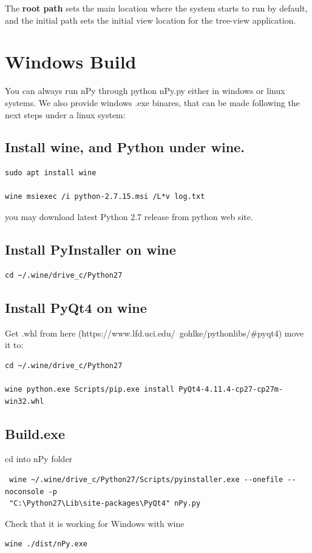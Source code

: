 \documentclass[a4paper,10pt]{article}
\begin{document}
The \textbf{root path} sets the main location where the system starts to run by default, and the initial path sets the initial view location for the tree-view application.

\section{Windows Build}

You can always run nPy through python nPy.py either in windows or linux systems. We also provide windows .exe binares, that can be made following the next steps under a linux system:

\subsection{Install wine, and Python under wine.}
\begin{verbatim}
sudo apt install wine

wine msiexec /i python-2.7.15.msi /L*v log.txt
\end{verbatim}

\noindent you may download latest Python 2.7 release from python web site.

\subsection{Install PyInstaller on wine}
\begin{verbatim}
cd ~/.wine/drive_c/Python27 
\end{verbatim}

\subsection{Install PyQt4 on wine}

\noindent Get .whl from here (https://www.lfd.uci.edu/~gohlke/pythonlibs/\#pyqt4) move it to: 
\begin{verbatim}
cd ~/.wine/drive_c/Python27

wine python.exe Scripts/pip.exe install PyQt4-4.11.4-cp27-cp27m-win32.whl
\end{verbatim}

\subsection{Build.exe}
\noindent cd into nPy folder 

\begin{verbatim}
 wine ~/.wine/drive_c/Python27/Scripts/pyinstaller.exe --onefile --noconsole -p 
 "C:\Python27\Lib\site-packages\PyQt4" nPy.py
\end{verbatim}

\noindent Check that it is working for Windows with wine
\begin{verbatim}
wine ./dist/nPy.exe
\end{verbatim}
\end{document}
